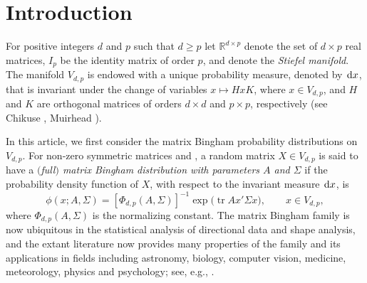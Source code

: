 \documentclass[pdftex]{sigma}
\numberwithin{equation}{section}
\def\R {\mathbb{R}}
\def\dd {\hskip1pt\mathrm{d}}
\def\tr {\mathop{\mathrm{tr}}}
\begin{document}


\renewcommand{\thefootnote}{\arabic{footnote}}
\setcounter{footnote}{0}

\section{Introduction}
\label{sec_introduction}

For positive integers $d$ and $p$ such that $d \ge p$ let $\R^{d \times p}$ denote the set of $d \times p$ real matrices, $I_p$ be the identity matrix of order $p$, and \smash{$V_{d,p} = \bigl\{x \in \R^{d \times p} \mid x'x = I_p\bigr\}$} denote the \textit{Stiefel manifold}. The manifold $V_{d,p}$ is endowed with a unique probability measure, denoted by $\dd x$, that is invariant under the change of variables $x \mapsto HxK$, where $x \in V_{d,p}$, and $H$ and $K$ are orthogonal matrices of orders $d \times d$ and $p \times p$, respectively (see Chikuse \cite[p.~16]{Chikuse}, Muirhead \cite[p.~70]{Muirhead}).

In this article, we first consider the matrix Bingham probability distributions on $V_{d,p}$. For non-zero symmetric matrices \smash{$A \in \R^{p \times p}$} and \smash{$\Sigma \in \R^{d \times d}$}, a random matrix $X \in V_{d,p}$ is said to have a {\it $($full$)$ matrix Bingham distribution with parameters $A$ and $\Sigma$} if the probability density function of $X$, with respect to the invariant measure $\dd x$, is
\begin{equation}
\label{eq_mBingham_pdf}
\phi(x;A,\Sigma) = [\Phi_{d,p}(A,\Sigma)]^{-1} \exp\bigl(\tr Ax'\Sigma x\bigr), \qquad x \in V_{d,p},
\end{equation}
where $\Phi_{d,p}(A,\Sigma)$ is the normalizing constant. The matrix Bingham family is now ubiquitous in the statistical analysis of directional data and shape analysis, and the extant literature now provides many properties of the family and its applications in fields including astronomy, biology, computer vision, medicine, meteorology, physics and psychology; see, e.g., \cite{BinghamCR,Chikuse,Dryden,JuppMardia2,KhatriMardia,KumeWood,KumePrestonWood,MardiaJupp,Prentice}.
\end{document}
